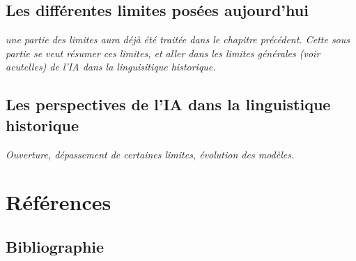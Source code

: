 \documentclass[12pt, french]{report}
\begin{document}
\section{Les différentes limites posées aujourd'hui}
\textit{une partie des limites aura déjà été traitée dans le chapitre précédent. Cette sous partie se veut résumer ces limites, et aller dans les limites générales (voir acutelles) de l'IA dans  la linguisitique historique.}
\section{Les perspectives de l'IA dans la linguistique historique}
\textit{Ouverture, dépassement de certaines limites, évolution des modèles.}

\chapter{Références}
\section{Bibliographie}

\printbibliography
\end{document}
